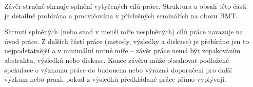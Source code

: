 Závěr stručně shrnuje splnění vytyčených cílů práce. 
Struktura a obsah této části je detailně probírána a procvičována v příslušných seminářích na oboru BMT.

Shrnutí splněných (nebo snad v menší míře nesplněných) cílů práce navazuje na úvod práce. 
Z dalších částí práce (metody, výsledky a diskuse) je přebíráno jen to nejpodstatnější a v minimální nutné míře – závěr práce nemá být zopakováním abstraktu, výsledků nebo diskuse. 
Konec závěru může obsahovat podložené spekulace o významu práce do budoucna nebo výrazná doporučení pro další výzkum nebo praxi, pokud z výsledků předkládané práce přímo vyplývají.
